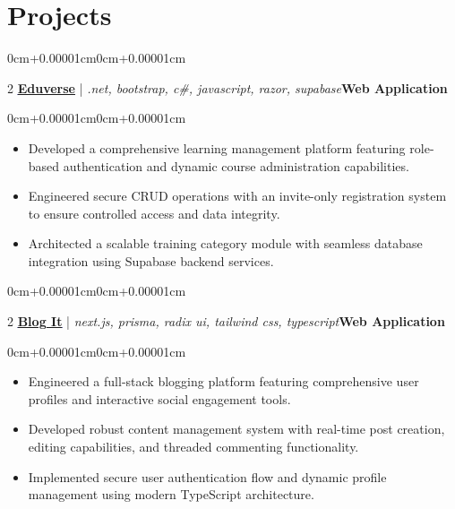 \documentclass[11pt, letterpaper]{article}
\newenvironment{highlights}{\begin{itemize}[topsep=0.08cm,parsep=0.08cm,partopsep=0pt,itemsep=0pt,leftmargin=0cm+10pt]}{\end{itemize}}
\newenvironment{onecolentry}{\begin{adjustwidth}{0cm+0.00001cm}{0cm+0.00001cm}}{\end{adjustwidth}}
\newenvironment{twocolentry}[2][]{\onecolentry\def\secondColumn{#2}\setcolumnwidth{\fill,5.2cm}\begin{paracol}{2}}{\switchcolumn \raggedleft \secondColumn\end{paracol}\endonecolentry}
\let\hrefWithoutArrow\href
\begin{document}
\section{Projects}
    \begin{twocolentry}{\textbf{Web Application}}
        \textbf{\textcolor{blue}{\underline{\hrefWithoutArrow{https://github.com/jlescarlan11/Eduverse}{Eduverse}}}} | \textit{.net, bootstrap, c\#, javascript, razor, supabase}\end{twocolentry}
    \vspace{0.10cm}
    \begin{onecolentry}
        \begin{highlights}
            \item Developed a comprehensive learning management platform featuring role-based authentication and dynamic course administration capabilities.
            \item Engineered secure CRUD operations with an invite-only registration system to ensure controlled access and data integrity.
            \item Architected a scalable training category module with seamless database integration using Supabase backend services.
        \end{highlights}
    \end{onecolentry}
    \vspace{0.15cm}
    \begin{twocolentry}{\textbf{Web Application}}
        \textbf{\textcolor{blue}{\underline{\hrefWithoutArrow{https://github.com/jlescarlan11/sutta-blogs}{Blog It}}}} | \textit{next.js, prisma, radix ui, tailwind css, typescript}\end{twocolentry}
    \vspace{0.10cm}
    \begin{onecolentry}
        \begin{highlights}
            \item Engineered a full-stack blogging platform featuring comprehensive user profiles and interactive social engagement tools.
            \item Developed robust content management system with real-time post creation, editing capabilities, and threaded commenting functionality.
            \item Implemented secure user authentication flow and dynamic profile management using modern TypeScript architecture.
        \end{highlights}
    \end{onecolentry}
\end{document}
